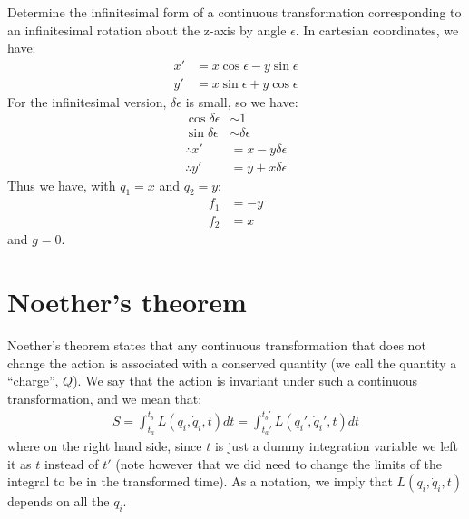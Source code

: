 \begin{example}{0pt}{Determine the infinitesimal form of a continuous transformation corresponding to an infinitesimal rotation about the z-axis by angle $\epsilon$.}{}
In cartesian coordinates, we have:
\begin{align*}
x'&=x\cos\epsilon -y\sin\epsilon\\
y'&=x\sin\epsilon +y\cos\epsilon
\end{align*}
For the infinitesimal version, $\delta\epsilon$ is small, so we have:
\begin{align*}
\cos\delta\epsilon &\sim 1\\
\sin\delta\epsilon &\sim \delta\epsilon\\
\therefore x'&=x-y\delta\epsilon\\
\therefore y'&=y+x\delta\epsilon
\end{align*}
Thus we have, with $q_1=x$ and $q_2=y$:
\begin{align*}
f_1&=-y\\
f_2&=x
\end{align*}
and $g=0$.
\label{ex:zrotation}
\end{example}

\section{Noether's theorem}
Noether's theorem states that any continuous transformation that does not change the action is associated with a conserved quantity (we call the quantity a ``charge'', $Q$). We say that the action is invariant under such a continuous transformation, and we mean that:
\begin{align}
S=\int_{t_a}^{t_b}L(q_i,\dot{q}_i,t)dt=\int_{t_a'}^{t_b'}L(q_i',\dot{q}_i',t)dt
\end{align}
where on the right hand side, since $t$ is just a dummy integration variable we left it as $t$ instead of $t'$ (note however that we did need to change the limits of the integral to be in the transformed time). As a notation, we imply that $L(q_i,\dot{q}_i,t)$ depends on all the $q_i$. 
 
